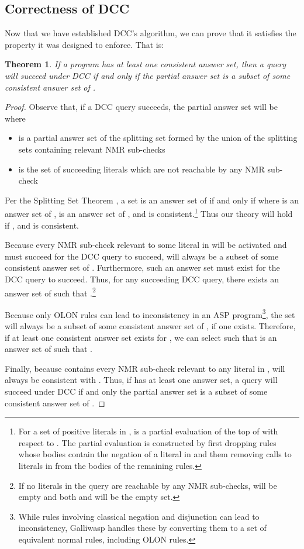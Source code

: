 \documentclass{new_tlp}
\newtheorem{theorem}{Theorem}
\begin{document}
\subsection{Correctness of DCC} \label{sec:proof}

Now that we have established DCC's algorithm, we can prove that it satisfies 
the property it was designed to enforce. That is:

\begin{theorem}
If a program  has at least one consistent answer set, then a query will
succeed under DCC if and only if the partial answer set is a subset of some
consistent answer set of .
\end{theorem}

\begin{proof}
Observe that, if a DCC query succeeds, the partial answer set will be 
 where
\begin{itemize}
\item  is a partial answer set of the splitting set  formed by the union
	of the splitting sets containing relevant NMR sub-checks
\item  is the set of succeeding literals which are not reachable by any NMR
	sub-check
\end{itemize}

\noindent Per the Splitting Set Theorem \cite{splitting}, a set  is an 
answer set of  if and only if  where  is an answer set
of ,  is an answer set of , and
 is consistent.\footnote{For a set  of positive literals in ,
 is a partial evaluation of the top of  with
respect to . The partial evaluation is constructed by first dropping rules
whose bodies contain the negation of a literal in  and them removing calls
to literals in  from the bodies of the remaining rules.} Thus our theory
will hold if ,  and  is consistent.

Because every NMR sub-check relevant to some literal in  will be activated 
and must succeed for the DCC query to succeed,  will always be a subset of 
some consistent answer set of . Furthermore, such an answer set must
exist for the DCC query to succeed. Thus, for any succeeding DCC query, there
exists an answer set  of  such that .\footnote{If
no literals in the query are reachable by any NMR sub-checks,  will be empty
and both  and  will be the empty set.}

Because only OLON rules can lead to inconsistency in an ASP
program\footnote{While rules involving classical negation and disjunction can
lead to inconsistency, Galliwasp handles these by converting them to a set of
equivalent normal rules, including OLON rules.}, the set  will always be a
subset of some consistent answer set of , if one
exists. Therefore, if at least one consistent answer set exists for , we can
select  such that  is an answer set of  
such that .

Finally, because  contains every NMR sub-check relevant to any literal in
,  will always be consistent with . Thus, if  has at least one
answer set, a query will succeed under DCC if and only the partial answer set
is a subset of some consistent answer set of .
\end{proof}
\end{document}
